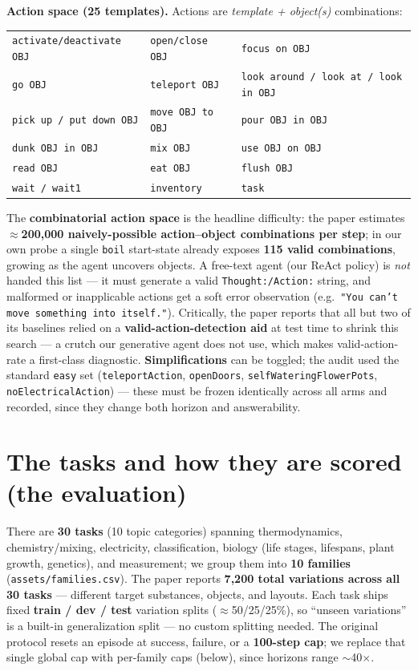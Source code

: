 \documentclass[10pt]{article}
\newcommand{\cmd}[1]{\texttt{\small #1}}
\begin{document}
\smallskip
\noindent\textbf{Action space (25 templates).} Actions are \emph{template + object(s)} combinations:

\begin{center}\small
\begin{tabular}{lll}
\cmd{activate/deactivate OBJ} & \cmd{open/close OBJ} & \cmd{focus on OBJ} \\
\cmd{go OBJ} & \cmd{teleport OBJ} & \cmd{look around / look at / look in OBJ} \\
\cmd{pick up / put down OBJ} & \cmd{move OBJ to OBJ} & \cmd{pour OBJ in OBJ} \\
\cmd{dunk OBJ in OBJ} & \cmd{mix OBJ} & \cmd{use OBJ on OBJ} \\
\cmd{read OBJ} & \cmd{eat OBJ} & \cmd{flush OBJ} \\
\cmd{wait / wait1} & \cmd{inventory} & \cmd{task} \\
\end{tabular}
\end{center}

\noindent The \textbf{combinatorial action space} is the headline difficulty: the paper estimates
\textbf{$\approx$200{,}000 naively-possible action--object combinations per step}; in our own probe a
single \cmd{boil} start-state already exposes \textbf{115 valid combinations}, growing as the agent
uncovers objects. A free-text agent (our ReAct policy) is \emph{not} handed this list --- it must generate
a valid \cmd{Thought:/Action:} string, and malformed or inapplicable actions get a soft error observation
(e.g.\ \cmd{"You can't move something into itself."}). Critically, the paper reports that all but two of
its baselines relied on a \textbf{valid-action-detection aid} at test time to shrink this search --- a
crutch our generative agent does not use, which makes valid-action-rate a first-class diagnostic.
\textbf{Simplifications} can be toggled; the audit used the standard \cmd{easy} set (\cmd{teleportAction},
\cmd{openDoors}, \cmd{selfWateringFlowerPots}, \cmd{noElectricalAction}) --- these must be frozen
identically across all arms and recorded, since they change both horizon and answerability.

\section{The tasks and how they are scored (the evaluation)}
There are \textbf{30 tasks} (10 topic categories) spanning thermodynamics, chemistry/mixing, electricity,
classification, biology (life stages, lifespans, plant growth, genetics), and measurement; we group them
into \textbf{10 families} (\cmd{assets/families.csv}). The paper reports \textbf{7{,}200 total variations
across all 30 tasks} --- different target substances, objects, and layouts. Each task ships fixed
\textbf{train / dev / test} variation splits ($\approx$50/25/25\%), so ``unseen variations'' is a
built-in generalization split --- no custom splitting needed. The original protocol resets an episode at
success, failure, or a \textbf{100-step cap}; we replace that single global cap with per-family caps
(below), since horizons range $\sim$40$\times$.
\end{document}
